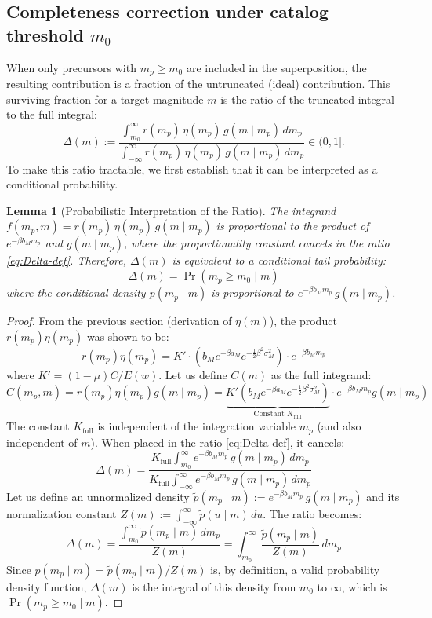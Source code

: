 \documentclass[linenum,doublespace,onecolumn]{SSA-SRL}
\theoremstyle{lemma}
\newtheorem{lemma}{Lemma}
\begin{document}
\medskip
\subsection{Completeness correction under catalog threshold $m_0$}
When only precursors with $m_p\ge m_0$ are included in the superposition, the resulting contribution is a fraction of the untruncated (ideal) contribution. This surviving fraction for a target magnitude $m$ is the ratio of the truncated integral to the full integral:
\begin{equation}\label{eq:Delta-def}
  \Delta(m):=
  \frac{\displaystyle\int_{m_0}^{\infty} r(m_p)\,\eta(m_p)\,g(m\mid m_p)\,dm_p}
       {\displaystyle\int_{-\infty}^{\infty} r(m_p)\,\eta(m_p)\,g(m\mid m_p)\,dm_p}\in(0,1].
\end{equation}
To make this ratio tractable, we first establish that it can be interpreted as a conditional probability.

\begin{lemma}[Probabilistic Interpretation of the Ratio]
The integrand $f(m_p, m) = r(m_p)\,\eta(m_p)\,g(m\mid m_p)$ is proportional to the product of $e^{-\beta b_M m_p}$ and $g(m\mid m_p)$, where the proportionality constant cancels in the ratio \eqref{eq:Delta-def}. Therefore, $\Delta(m)$ is equivalent to a conditional tail probability:
\[
\Delta(m) = \Pr(m_p\ge m_0\mid m)
\]
where the conditional density $p(m_p \mid m)$ is proportional to $e^{-\beta b_M m_p}\,g(m\mid m_p)$.
\end{lemma}

\begin{proof}
From the previous section (derivation of $\eta(m)$), the product $r(m_p)\eta(m_p)$ was shown to be:
\[
r(m_p)\eta(m_p) = K' \cdot \left( b_M e^{-\beta a_M} e^{-\frac{1}{2}\beta^2 \sigma_M^2} \right) \cdot e^{-\beta b_M m_p}
\]
where $K' = (1-\mu)C / E(w)$. Let us define $C(m)$ as the full integrand:
\[
C(m_p, m) = r(m_p)\eta(m_p)g(m\mid m_p) = \underbrace{K' \left( b_M e^{-\beta a_M} e^{-\frac{1}{2}\beta^2 \sigma_M^2} \right)}_{\text{Constant } K_{\text{full}}} \cdot e^{-\beta b_M m_p} g(m\mid m_p)
\]
The constant $K_{\text{full}}$ is independent of the integration variable $m_p$ (and also independent of $m$). When placed in the ratio \eqref{eq:Delta-def}, it cancels:
\[
\Delta(m) = \frac{\displaystyle K_{\text{full}} \int_{m_0}^{\infty} e^{-\beta b_M m_p}\,g(m\mid m_p)\,dm_p}
          {\displaystyle K_{\text{full}} \int_{-\infty}^{\infty} e^{-\beta b_M m_p}\,g(m\mid m_p)\,dm_p}
\]
Let us define an unnormalized density $\tilde{p}(m_p\mid m) := e^{-\beta b_M m_p}\,g(m\mid m_p)$ and its normalization constant $Z(m) := \int_{-\infty}^{\infty}\tilde{p}(u\mid m)\,du$. The ratio becomes:
\[
\Delta(m) = \frac{\displaystyle\int_{m_0}^{\infty} \tilde{p}(m_p\mid m)\,dm_p}{Z(m)} = \int_{m_0}^{\infty} \frac{\tilde{p}(m_p\mid m)}{Z(m)}\,dm_p
\]
Since $p(m_p \mid m) = \tilde{p}(m_p\mid m) / Z(m)$ is, by definition, a valid probability density function, $\Delta(m)$ is the integral of this density from $m_0$ to $\infty$, which is $\Pr(m_p\ge m_0\mid m)$.
\end{proof}
\end{document}
